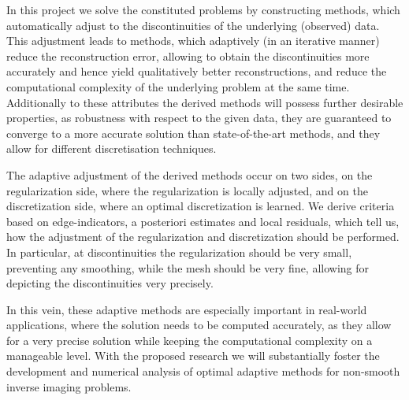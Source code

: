\documentclass[enabledeprecatedfontcommands,cleardoublepage=empty,headsepline,twoside,11pt,DIV=15,BCOR=12mm,final]{scrartcl}
\begin{document}
In this project we solve the constituted problems by constructing methods, which automatically adjust to the discontinuities of the underlying (observed) data. This adjustment leads to methods, which adaptively (in an iterative manner) reduce the reconstruction error, allowing to obtain the discontinuities more accurately and hence yield qualitatively better reconstructions, and reduce the computational complexity of the underlying problem at the same time. Additionally to these attributes the derived methods will possess further desirable properties, as robustness with respect to the given data, they are guaranteed to converge to a more accurate solution than state-of-the-art methods, and they allow for different discretisation techniques. 

The adaptive adjustment of the derived methods occur on two sides, on the regularization side, where the regularization is locally adjusted, and on the discretization side, where an optimal discretization is learned. We derive criteria based on edge-indicators, a posteriori estimates and local residuals, which tell us, how the adjustment of the regularization and discretization should be performed. In particular, at discontinuities the regularization should be very small, preventing any smoothing, while the mesh should be very fine, allowing for depicting the discontinuities very precisely. 

In this vein, these adaptive methods are especially important in real-world applications, where the solution needs to be computed accurately, as they allow for a very precise solution while keeping the computational complexity on a manageable level. With the proposed research we will substantially foster the development and numerical analysis of optimal adaptive methods for non-smooth inverse imaging problems. %

\end{document}

